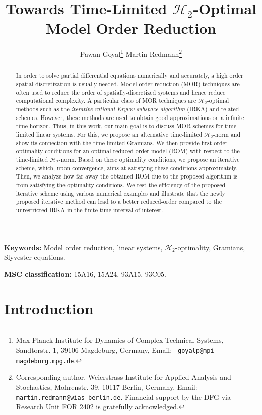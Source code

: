 \documentclass[a4paper,11pt, twoside]{article}
\title{Towards Time-Limited $\mathcal H_2$-Optimal Model Order Reduction}
\author{Pawan Goyal\thanks{Max Planck Institute for Dynamics of Complex Technical Systems, Sandtorstr. 1, 39106 Magdeburg, Germany, Email: {\tt 
			goyalp@mpi-magdeburg.mpg.de}.}\quad 
				Martin Redmann\thanks{Corresponding author. Weierstrass Institute for Applied Analysis and Stochastics, Mohrenstr. 39, 10117 Berlin, Germany, Email: {\tt 
martin.redmann@wias-berlin.de}.  Financial support by the DFG via Research Unit FOR 2402 is gratefully acknowledged.}}
\begin{document}
\maketitle

\begin{abstract}
In order to solve partial differential equations numerically and accurately,  a high order spatial discretization is usually needed. Model order 
reduction (MOR) techniques are often used to reduce the order of spatially-discretized systems and hence reduce computational 
complexity. A particular class of MOR techniques are $\mathcal H_2$-optimal methods such as the \emph{iterative rational Krylov subspace algorithm} 
(IRKA) and related schemes. However, these methods are used to obtain good approximations on a infinite time-horizon. Thus, in this work, our main 
goal is to discuss MOR schemes for time-limited linear systems. For this, we propose an alternative time-limited $\mathcal H_2$-norm
and show its connection with the time-limited Gramians.  We then provide first-order optimality conditions for an optimal reduced order model (ROM) 
with respect to the time-limited  $\mathcal H_2$-norm. Based on these optimality conditions, we propose an iterative scheme, which, upon convergence, 
aims at satisfying these conditions approximately. Then, we analyze how far away the obtained ROM due to the proposed algorithm is from satisfying the 
optimality conditions. We test the efficiency of the proposed iterative scheme using various numerical examples and illustrate that the newly proposed 
iterative method can lead to a better reduced-order compared to the unrestricted IRKA in the finite time interval of interest. 
\end{abstract}
\textbf{Keywords:} Model order reduction, linear systems, $\mathcal H_2$-optimality, Gramians, Slyvester equations. 

\noindent\textbf{MSC classification:}  15A16, 15A24,  93A15, 93C05.



\section{Introduction}
\end{document}
